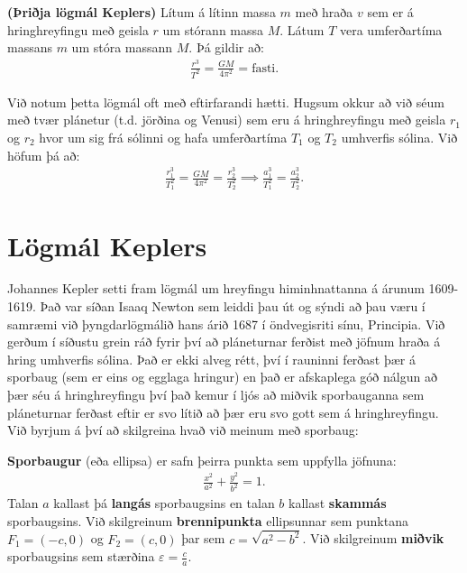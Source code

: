 \begin{tcolorbox}
\begin{theorem}
    \textbf{(Þriðja lögmál Keplers)} Lítum á lítinn massa $m$ með hraða $v$ sem er á hringhreyfingu með geisla $r$ um stórann massa $M$. Látum $T$ vera umferðartíma massans $m$ um stóra massann $M$. Þá gildir að:
\begin{align*}
    \frac{r^3}{T^2} = \frac{GM}{4\pi^2} = \text{fasti}.
\end{align*}
\end{theorem}
\end{tcolorbox}

Við notum þetta lögmál oft með eftirfarandi hætti. Hugsum okkur að við séum með tvær plánetur (t.d. jörðina og Venusi) sem eru á hringhreyfingu með geisla $r_1$ og $r_2$ hvor um sig frá sólinni og hafa umferðartíma $T_1$ og $T_2$ umhverfis sólina. Við höfum þá að:
\begin{align*}
    \frac{r_1^3}{T_1^2} = \frac{GM}{4\pi^2} = \frac{r_2^3}{T_2^2} \implies \frac{a_1^3}{T_1^2} = \frac{a_2^3}{T_2^2}.
\end{align*}







\newpage

\section{Lögmál Keplers}


Johannes Kepler setti fram lögmál um hreyfingu himinhnattanna á árunum 1609-1619. Það var síðan Isaaq Newton sem leiddi þau út og sýndi að þau væru í samræmi við þyngdarlögmálið hans árið 1687 í öndvegisriti sínu, Principia. Við gerðum í síðustu grein ráð fyrir því að pláneturnar ferðist með jöfnum hraða á hring umhverfis sólina. Það er ekki alveg rétt, því í rauninni ferðast þær á sporbaug (sem er eins og egglaga hringur) en það er afskaplega góð nálgun að þær séu á hringhreyfingu því það kemur í ljós að miðvik sporbauganna sem pláneturnar ferðast eftir er svo lítið að þær eru svo gott sem á hringhreyfingu. Við byrjum á því að skilgreina hvað við meinum með sporbaug:

\begin{tcolorbox}
\begin{definition}
\textbf{Sporbaugur} (eða ellipsa) er safn þeirra punkta sem uppfylla jöfnuna:
\begin{align*}
    \frac{x^2}{a^2} + \frac{y^2}{b^2} = 1.
\end{align*}
Talan $a$ kallast þá \textbf{langás} sporbaugsins en talan $b$ kallast \textbf{skammás} sporbaugsins. Við skilgreinum \textbf{brennipunkta} ellipsunnar sem punktana $F_1 = (-c,0)$ og $F_2 = (c,0)$ þar sem $c =\sqrt{a^2 - b^2}$. Við skilgreinum \textbf{miðvik} sporbaugsins sem stærðina $ \varepsilon = \frac{c}{a}$.
\end{definition}
\end{tcolorbox}

